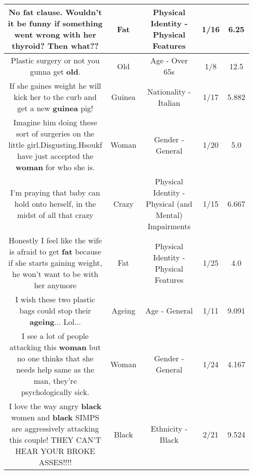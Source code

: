 \documentclass[11pt]{article}
\newlength\mylength
\begin{document}
\begin{center}
\begin{longtable}{|C{.65\mylength}|C{.30\mylength}|C{.12\mylength}|C{.12\mylength}|C{.12\mylength}|}
  \small No \textbf{fat} clause. Wouldn't it be funny if something went wrong with her thyroid? Then what??\normalsize   & Fat & Physical Identity - Physical Features & 1/16 & 6.25 \\  \hline
  \small Plastic surgery or not you gunna get \textbf{old}.\normalsize   & Old & Age - Over 65s & 1/8 & 12.5 \\  \hline
  \small If she gaines weight he will kick her to the curb and get a new \textbf{guinea} pig!\normalsize   & Guinea & Nationality - Italian & 1/17 & 5.882 \\  \hline
  \small Imagine him doing these sort of surgeries on the little girl.Disgusting.Hsoukf have just accepted the \textbf{woman} for who she is.\normalsize   & Woman & Gender - General & 1/20 & 5.0 \\  \hline
  \small I'm praying that baby can hold onto herself,  in the midst of all that crazy\normalsize   & Crazy & Physical Identity - Physical (and Mental) Impairments & 1/15 & 6.667 \\  \hline
  \small Honestly I feel like the wife is afraid to get \textbf{fat} because if she starts gaining weight, he won't want to be with her anymore\normalsize   & Fat & Physical Identity - Physical Features & 1/25 & 4.0 \\  \hline
  \small I wish these two plastic bags could stop their \textbf{ageing}... Lol...\normalsize   & Ageing & Age - General & 1/11 & 9.091 \\  \hline
  \small I see a lot of people attacking this \textbf{woman} but no one thinks that she needs help same as the man, they're psychologically sick.\normalsize   & Woman & Gender - General & 1/24 & 4.167 \\  \hline
  \small I love the way angry \textbf{black} women and \textbf{black} SIMPS are aggressively attacking this couple! THEY CAN'T HEAR YOUR BROKE ASSES!!!!\normalsize   & Black & Ethnicity - Black & 2/21 & 9.524 \\  \hline

\end{longtable}
\end{center}
\end{document}
